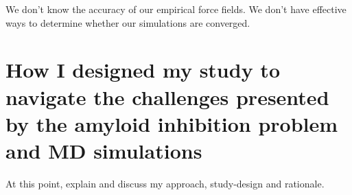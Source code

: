 \1 We don't know the accuracy of our empirical force fields. We don't have effective ways to determine whether our simulations are converged.

\section{How I designed my study to navigate the challenges presented by the amyloid inhibition problem and MD simulations}
At this point, explain and discuss my approach, study-design and rationale.







% 
% 
% 
% 
% 

